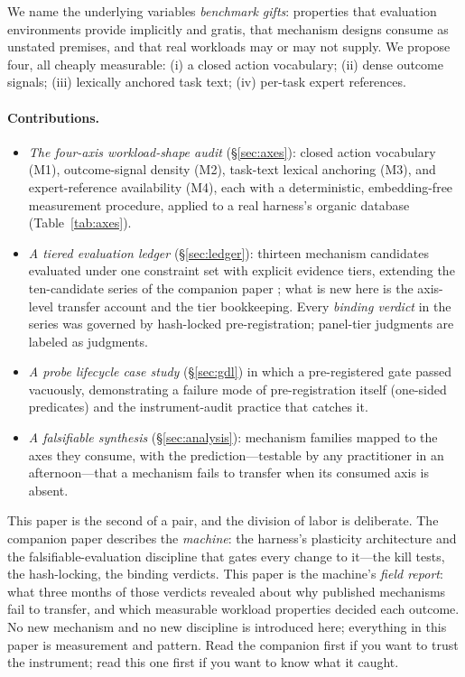 \documentclass[11pt]{article}
\begin{document}
We name the underlying variables \emph{benchmark gifts}: properties that evaluation environments provide implicitly and gratis, that mechanism designs consume as unstated premises, and that real workloads may or may not supply. We propose four, all cheaply measurable: (i) a closed action vocabulary; (ii) dense outcome signals; (iii) lexically anchored task text; (iv) per-task expert references.

\paragraph{Contributions.}
\begin{itemize}
  \item \emph{The four-axis workload-shape audit} (\S\ref{sec:axes}): closed action vocabulary (M1), outcome-signal density (M2), task-text lexical anchoring (M3), and expert-reference availability (M4), each with a deterministic, embedding-free measurement procedure, applied to a real harness's organic database (Table~\ref{tab:axes}).
  \item \emph{A tiered evaluation ledger} (\S\ref{sec:ledger}): thirteen mechanism candidates evaluated under one constraint set with explicit evidence tiers, extending the ten-candidate series of the companion paper \citep{canivel2026plasticity}; what is new here is the axis-level transfer account and the tier bookkeeping. Every \emph{binding verdict} in the series was governed by hash-locked pre-registration; panel-tier judgments are labeled as judgments.
  \item \emph{A probe lifecycle case study} (\S\ref{sec:gdl}) in which a pre-registered gate passed vacuously, demonstrating a failure mode of pre-registration itself (one-sided predicates) and the instrument-audit practice that catches it.
  \item \emph{A falsifiable synthesis} (\S\ref{sec:analysis}): mechanism families mapped to the axes they consume, with the prediction---testable by any practitioner in an afternoon---that a mechanism fails to transfer when its consumed axis is absent.
\end{itemize}

This paper is the second of a pair, and the division of labor is deliberate. The companion paper \citep{canivel2026plasticity} describes the \emph{machine}: the harness's plasticity architecture and the falsifiable-evaluation discipline that gates every change to it---the kill tests, the hash-locking, the binding verdicts. This paper is the machine's \emph{field report}: what three months of those verdicts revealed about why published mechanisms fail to transfer, and which measurable workload properties decided each outcome. No new mechanism and no new discipline is introduced here; everything in this paper is measurement and pattern. Read the companion first if you want to trust the instrument; read this one first if you want to know what it caught.
\end{document}
